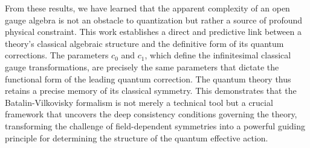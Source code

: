 \documentclass[twocolumn]{aastex631}
\begin{document}
From these results, we have learned that the apparent complexity of an open gauge algebra is not an obstacle to quantization but rather a source of profound physical constraint. This work establishes a direct and predictive link between a theory's classical algebraic structure and the definitive form of its quantum corrections. The parameters $c_0$ and $c_1$, which define the infinitesimal classical gauge transformations, are precisely the same parameters that dictate the functional form of the leading quantum correction. The quantum theory thus retains a precise memory of its classical symmetry. This demonstrates that the Batalin-Vilkovisky formalism is not merely a technical tool but a crucial framework that uncovers the deep consistency conditions governing the theory, transforming the challenge of field-dependent symmetries into a powerful guiding principle for determining the structure of the quantum effective action.

{}

\end{document}
